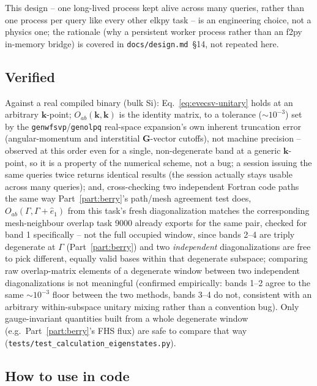 \documentclass[11pt]{article}
\begin{document}
This design -- one long-lived process kept alive across many queries, rather than one process
per query like every other elkpy task -- is an engineering choice, not a physics one; the
rationale (why a persistent worker process rather than an f2py in-memory bridge) is covered in
\texttt{docs/design.md}~\S14, not repeated here.

\subsection{Verified}

Against a real compiled binary (bulk Si): Eq.~\eqref{eq:evecsv-unitary} holds at an arbitrary
$\mathbf k$-point; $O_{ab}(\mathbf k,\mathbf k)$ is the identity matrix, to a tolerance
($\sim 10^{-3}$) set by the \texttt{genwfsvp}/\texttt{genolpq} real-space expansion's own
inherent truncation error (angular-momentum and interstitial $\mathbf G$-vector cutoffs), not
machine precision -- observed at this order even for a single, non-degenerate band at a
generic $\mathbf k$-point, so it is a property of the numerical scheme, not a bug; a session
issuing the same queries twice returns identical results (the session actually stays usable
across many queries); and, cross-checking two independent Fortran code paths the same way
Part~\ref{part:berry}'s path/mesh agreement test does, $O_{ab}(\Gamma,\Gamma+\hat e_1)$ from
this task's fresh diagonalization matches the corresponding mesh-neighbour overlap task 9000
already exports for the same pair, checked for band 1 specifically -- not the full occupied
window, since bands 2--4 are triply degenerate at $\Gamma$ (Part~\ref{part:berry}) and two
\emph{independent} diagonalizations are free to pick different, equally valid bases within
that degenerate subspace; comparing raw overlap-matrix elements of a degenerate window
between two independent diagonalizations is not meaningful (confirmed empirically: bands 1--2
agree to the same $\sim 10^{-3}$ floor between the two methods, bands 3--4 do not, consistent
with an arbitrary within-subspace unitary mixing rather than a convention bug). Only
gauge-invariant quantities built from a whole degenerate window (e.g.\ Part~\ref{part:berry}'s
FHS flux) are safe to compare that way (\texttt{tests/test\_calculation\_eigenstates.py}).

\subsection{How to use in code}
\end{document}
